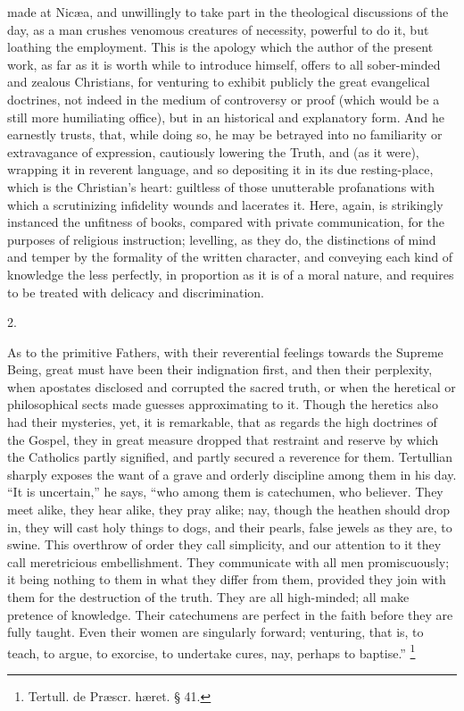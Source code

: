 made at Nicæa, and unwillingly to take part in the theological
discussions of the day, as a man crushes venomous creatures of
necessity, powerful to do it, but loathing the employment. This is the
apology which the author of the present work, as far as it is worth
while to introduce himself, offers to all sober-minded and zealous
Christians, for venturing to exhibit publicly the great evangelical
doctrines, not indeed in the medium of controversy or proof (which
would be a still more humiliating office), but in an historical and
explanatory form. And he earnestly trusts, that, while doing so, he
may be betrayed into no familiarity or extravagance of expression,
cautiously lowering the Truth, and (as it were), wrapping it in
reverent language, and so depositing it in its due resting-place,
which is the Christian's heart: guiltless of those unutterable
profanations with which a scrutinizing infidelity wounds and lacerates
it. Here, again, is strikingly instanced the unfitness of books,
compared with private communication, for the purposes of religious
instruction; levelling, as they do, the distinctions of mind and
temper by the formality of the written character, and conveying each
kind of knowledge the less perfectly, in proportion as it is of
a moral nature, and requires to be treated with delicacy and
discrimination.

2.

As to the primitive Fathers, with their reverential feelings
towards the Supreme Being, great must have been their indignation
first, and then their perplexity, when apostates disclosed and
corrupted the sacred truth, or when the heretical or philosophical
sects made guesses approximating to it. Though the heretics also had
their mysteries, yet, it is remarkable, that as regards the high
doctrines of the Gospel, they in great measure dropped that restraint
and reserve by which the Catholics partly signified, and partly
secured a reverence for them. Tertullian sharply exposes the want of a
grave and orderly discipline among them in his day. ``It is
uncertain,'' he says, ``who among them is catechumen, who
believer. They meet alike, they hear alike, they pray alike; nay,
though the heathen should drop in, they will cast holy things to dogs,
and their pearls, false jewels as they are, to swine. This overthrow
of order they call simplicity, and our attention to it they call
meretricious embellishment. They communicate with all men
promiscuously; it being nothing to them in what they differ from them,
provided they join with them for the destruction of the truth. They
are all high-minded; all make pretence of knowledge. Their catechumens
are perfect in the faith before they are fully taught. Even their
women are singularly forward; venturing, that is, to teach, to argue,
to exorcise, to undertake cures, nay, perhaps to baptise.'' \footnote{Tertull. de Præscr. hæret. § 41.}

